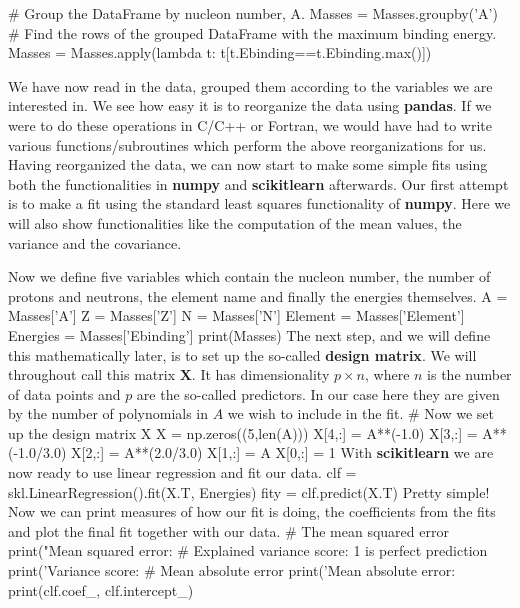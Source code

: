 \documentclass[%
oneside,                 %
final,                   %
10pt]{article}
\begin{document}
# Group the DataFrame by nucleon number, A.
Masses = Masses.groupby('A')
# Find the rows of the grouped DataFrame with the maximum binding energy.
Masses = Masses.apply(lambda t: t[t.Ebinding==t.Ebinding.max()])
\epycod

We have now read in the data, grouped them according to the variables we are interested in. 
We see how easy it is to reorganize the data using \textbf{pandas}. If we
were to do these operations in C/C++ or Fortran, we would have had to
write various functions/subroutines which perform the above
reorganizations for us.  Having reorganized the data, we can now start
to make some simple fits using both the functionalities in \textbf{numpy} and
\textbf{scikitlearn} afterwards. Our first attempt is to make a fit using the
standard least squares functionality of \textbf{numpy}. Here we will also
show functionalities like the computation of the mean values, the
variance and the covariance. 

Now we define five variables which contain
the nucleon number, the number of protons and neutrons, the element name and finally the energies themselves.
\bpycod
A = Masses['A']
Z = Masses['Z']
N = Masses['N']
Element = Masses['Element']
Energies = Masses['Ebinding']
print(Masses)
\epycod
The next step, and we will define this mathematically later, is to set up the so-called \textbf{design matrix}. We will throughout call this matrix $\bm{X}$.
It has dimensionality $p\times n$, where $n$ is the number of data points and $p$ are the so-called predictors. In our case here they are given by the number of polynomials in $A$ we wish to include in the fit. 
\bpycod
# Now we set up the design matrix X
X = np.zeros((5,len(A)))
X[4,:] = A**(-1.0)
X[3,:] = A**(-1.0/3.0)
X[2,:] = A**(2.0/3.0)
X[1,:] = A
X[0,:] = 1
\epycod
With \textbf{scikitlearn} we are now ready to use linear regression and fit our data.
\bpycod
clf = skl.LinearRegression().fit(X.T, Energies)
fity = clf.predict(X.T)
\epycod
Pretty simple!  
Now we can print measures of how our fit is doing, the coefficients from the fits and plot the final fit together with our data.
\bpycod
# The mean squared error                               
print("Mean squared error: %
# Explained variance score: 1 is perfect prediction                                 
print('Variance score: %
# Mean absolute error                                                           
print('Mean absolute error: %
print(clf.coef_, clf.intercept_)
\end{document}
